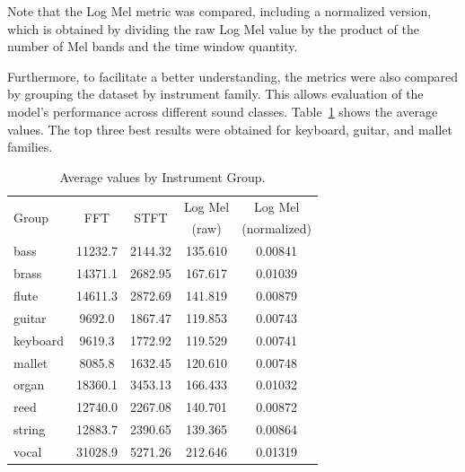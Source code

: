 \documentclass[10pt,conference]{IEEEtran}
\begin{document}
Note that the Log Mel metric was compared, including a normalized version, which is obtained by dividing the raw Log Mel value by the product of the number of Mel bands and the time window quantity.



Furthermore, to facilitate a better understanding, the metrics were also compared by grouping the dataset by instrument family. This allows evaluation of the model's performance across different sound classes. Table~\ref{tab:avg_metrics_groups} shows the average values.
The top three best results were obtained for keyboard, guitar, and mallet families.



\begin{table}[htb] \small
  \caption{Average values by Instrument Group.}
  \label{tab:avg_metrics_groups}
  \begin{tabular*}{\columnwidth}
	{@{\extracolsep{\fill}}lcccc}
    \toprule
    \multirow{2}{*}{Group} & \multirow{2}{*}{FFT} & \multirow{2}{*}{STFT} & Log Mel& Log Mel \\
    &   &   &   (raw)  & (normalized) \\
    \midrule
    bass     & 11232.7 & 2144.32 & 135.610 & 0.00841 \\
    brass    & 14371.1 & 2682.95 & 167.617 & 0.01039 \\
    flute    & 14611.3 & 2872.69 & 141.819 & 0.00879 \\
    guitar   & 9692.0  & 1867.47 & 119.853 & 0.00743 \\
    keyboard & 9619.3  & 1772.92 & 119.529 & 0.00741 \\
    mallet   & 8085.8  & 1632.45 & 120.610 & 0.00748 \\
    organ    & 18360.1 & 3453.13 & 166.433 & 0.01032 \\
    reed     & 12740.0 & 2267.08 & 140.701 & 0.00872 \\
    string   & 12883.7 & 2390.65 & 139.365 & 0.00864 \\
    vocal    & 31028.9 & 5271.26 & 212.646 & 0.01319 \\
    \bottomrule
  \end{tabular*}
\end{table}
\end{document}
